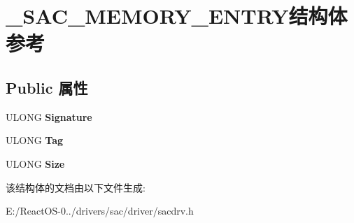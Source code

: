 \hypertarget{struct___s_a_c___m_e_m_o_r_y___e_n_t_r_y}{}\section{\+\_\+\+S\+A\+C\+\_\+\+M\+E\+M\+O\+R\+Y\+\_\+\+E\+N\+T\+R\+Y结构体 参考}
\label{struct___s_a_c___m_e_m_o_r_y___e_n_t_r_y}
\subsection*{Public 属性}
\begin{DoxyCompactItemize}
\item 
\mbox{\label{struct___s_a_c___m_e_m_o_r_y___e_n_t_r_y_ad64c8124aca61a344bd035ff7b21e734}} 
U\+L\+O\+NG {\bfseries Signature}
\item 
\mbox{\label{struct___s_a_c___m_e_m_o_r_y___e_n_t_r_y_a7bbe65a761f1bc294738f9a5e6a61e98}} 
U\+L\+O\+NG {\bfseries Tag}
\item 
\mbox{\label{struct___s_a_c___m_e_m_o_r_y___e_n_t_r_y_a1ac224dd1d88dd6d8b60f73bcb47a743}} 
U\+L\+O\+NG {\bfseries Size}
\end{DoxyCompactItemize}


该结构体的文档由以下文件生成\+:\begin{DoxyCompactItemize}
\item 
E\+:/\+React\+O\+S-\/0../drivers/sac/driver/sacdrv.\+h\end{DoxyCompactItemize}
